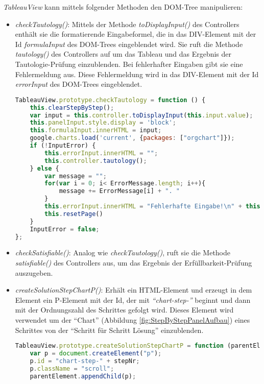 \textit{TableauView} kann mittels folgender Methoden den DOM-Tree manipulieren:
\begin{itemize}
\item	\textit{checkTautology()}: Mittels der Methode \textit{toDisplayInput()} des Controllers enthält sie die formatierende Eingabeformel, die in das DIV-Element mit der Id \textit{formulaInput} des DOM-Trees eingeblendet wird. Sie ruft die Methode \textit{tautology()} des Controllers auf um das Tableau und das Ergebnis der Tautologie-Prüfung einzublenden. Bei fehlerhafter Eingaben gibt sie eine Fehlermeldung aus. Diese Fehlermeldung wird in das DIV-Element mit der Id \textit{errorInput} des DOM-Trees eingeblendet.
\begin{lstlisting}[language=JavaScript, caption= checkTautology()(Klasse TableauView), basicstyle=\scriptsize] 
TableauView.prototype.checkTautology = function () {
    this.clearStepByStep();
    var input = this.controller.toDisplayInput(this.input.value);
    this.panelInput.style.display = 'block';
    this.formulaInput.innerHTML = input;
    google.charts.load('current', {packages: ["orgchart"]});
    if (!InputError) {
        this.errorInput.innerHTML = "";
        this.controller.tautology();
    } else {
        var message = "";
        for(var i = 0; i< ErrorMessage.length; i++){
            message += ErrorMessage[i] + ". "
        }
        this.errorInput.innerHTML = "Fehlerhafte Eingabe!\n" + this.translateMessage(message);
        this.resetPage()
    }
    InputError = false;
};
\end{lstlisting}
\item	\textit{checkSatisfiable()}: Analog wie \textit{checkTautology()}, ruft sie die Methode \textit{satisfiable()} des Controllers aus, um das Ergebnis der Erfüllbarkeit-Prüfung auszugeben.
\item	\textit{createSolutionStepChartP()}: Erhält ein HTML-Element und erzeugt in dem Element ein P-Element mit der Id, der mit \textit{``chart-step-''} beginnt und dann mit der Ordnungszahl des Schrittes gefolgt wird. Dieses Element wird verwendet um der ``Chart'' (Abbildung \ref{fig:StepByStepPanelAufbau}) eines Schrittes von der ``Schritt für Schritt Lösung'' einzublenden.
\begin{lstlisting}[language=JavaScript, caption= createSolutionStepChartP(Klasse TableauView), basicstyle=\scriptsize] 
TableauView.prototype.createSolutionStepChartP = function (parentElement) {
    var p = document.createElement("p");
    p.id = "chart-step-" + stepNr;
    p.className = "scroll";
    parentElement.appendChild(p);

\end{lstlisting}
\end{itemize}
